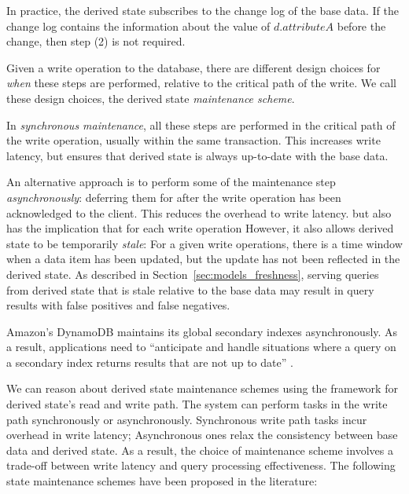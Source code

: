 In practice, the derived state subscribes to the change log of the base data.
If the change log contains the information about the value of $d.attributeA$ before the change, then step (2) is not
required.

Given a write operation to the database,
there are different design choices for \textit{when} these steps are performed, relative to the critical
path of the write.
We call these design choices, the derived state \textit{maintenance scheme}.

In \textit{synchronous maintenance}, all these steps are performed in the critical path of the write operation,
usually within the same transaction.
This increases write latency, but ensures that derived state is always up-to-date with the base data.

An alternative approach is to perform some of the maintenance step \textit{asynchronously}:
deferring them for after the write operation has been acknowledged to the client.
This reduces the overhead to write latency.
but also has the implication that for each write operation
However, it also allows derived state to be temporarily \textit{stale}:
For a given write operations, there is a time window when a data item has been updated,
but the update has not been reflected in the derived state.
As described in Section~\ref{sec:models_freshness},
serving queries from derived state that is stale relative to the base data may result in query results with false positives
and false negatives.

Amazon's DynamoDB maintains its global secondary indexes asynchronously.
As a result, applications need to ``anticipate and handle situations where a query on a secondary index returns results that are
not up to date'' \cite{dynamodb:async}.

We can reason about derived state maintenance schemes using the framework for derived state's read and write path.
The system can perform tasks in the write path synchronously or asynchronously.
Synchronous write path tasks incur overhead in write latency;
Asynchronous ones relax the consistency between base data and derived state.
As a result, the choice of maintenance scheme involves a trade-off between write latency and query processing effectiveness.
The following state maintenance schemes have been proposed in the literature:


